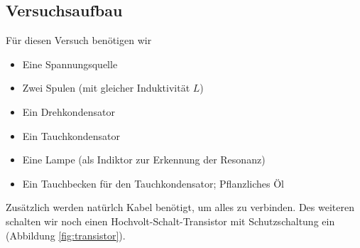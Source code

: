\documentclass[10pt,a4paper]{article}
\begin{document}
\subsection{Versuchsaufbau}
\begin{flushleft}
Für diesen Versuch benötigen wir
\begin{itemize}[itemsep=0pt]
\item Eine Spannungsquelle
\item Zwei Spulen (mit gleicher Induktivität $L$)
\item Ein Drehkondensator
\item Ein Tauchkondensator
\item Eine Lampe (als Indiktor zur Erkennung der Resonanz)
\item Ein Tauchbecken für den Tauchkondensator; Pflanzliches Öl
\end{itemize}
Zusätzlich werden natürlch Kabel benötigt, um alles zu verbinden. Des weiteren schalten wir noch einen Hochvolt-Schalt-Transistor mit Schutzschaltung ein (Abbildung \ref{fig:transistor}).
\end{flushleft}
\end{document}

